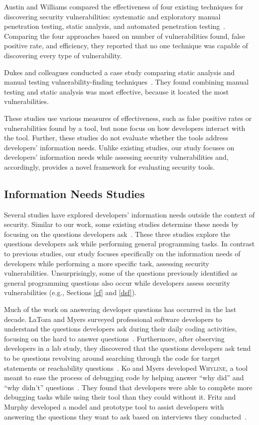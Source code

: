 \documentclass{sig-alternate}
\begin{document}
Austin and Williams compared the effectiveness of four existing techniques for discovering security vulnerabilities: systematic and exploratory manual  penetration testing, static analysis, and automated penetration testing~\cite{austin2011one}. 
Comparing the four approaches based on number of vulnerabilities found, false positive rate, and efficiency, they reported that no one technique was capable of discovering every type of vulnerability. 

Dukes and colleagues conducted a case study comparing static analysis and manual testing vulnerability-finding techniques~\cite{dukes2013case}. 
They found combining manual testing and static analysis was most effective, because it located the most vulnerabilities.

These studies use various measures of effectiveness, such as false positive rates or vulnerabilities found by a tool, but none focus on how developers interact with the tool. 
Further, these studies do not evaluate whether the tools address developers' information needs. 
Unlike existing studies, our study focuses on developers' information needs while assessing security vulnerabilities and, accordingly, provides a novel framework for evaluating security tools.

\subsection{Information Needs Studies}
\label{questions}
Several studies have explored developers' information needs outside the context of security.
Similar to our work, some existing studies determine these needs by focusing on the questions developers ask~\cite{latoza2010hard, latoza2010developers, ko2007information}.
These three studies explore the questions developers ask while performing general programming tasks.
In contrast to previous studies, our study focuses specifically on the information needs of developers while performing a more specific task, assessing security vulnerabilities.
Unsurprisingly, some of the questions previously identified as general programming questions also occur while developers assess security vulnerabilities (e.g., Sections \ref{cf} and \ref{dsf}).

Much of the work on answering developer questions has occurred in the last decade. 
LaToza and Myers surveyed professional software developers to understand the questions developers ask during their daily coding activities, focusing on the hard to answer questions~\cite{latoza2010hard}. 
Furthermore, after observing developers in a lab study, they discovered that the questions developers ask tend to be questions revolving around searching through the code for target statements or reachability questions~\cite{latoza2010developers}. 
Ko and Myers developed \textsc{Whyline}, a tool meant to ease the process of debugging code by helping answer ``why did'' and ``why didn't'' questions~\cite{ko2004designing}. 
They found that developers were able to complete more debugging tasks while using their tool than they could without it.
Fritz and Murphy developed a model and prototype tool to assist developers with answering the questions they want to ask based on interviews they conducted~\cite{fritz2010using}.
\end{document}
